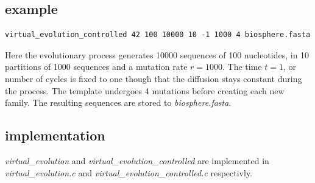 \subsection{example}
\begin{lstlisting}
virtual_evolution_controlled 42 100 10000 10 -1 1000 4 biosphere.fasta
\end{lstlisting}
Here the evolutionary process generates 10000 sequences of 100
nucleotides, in 10 partitions of 1000 sequences and a mutation rate
$r=1000$. The time $t=1$, or number of cycles is fixed to one though
that the diffusion stays constant during the process. The template
undergoes 4 mutations before creating each new family. The resulting
sequences are stored to \emph{biosphere.fasta}.

\subsection{implementation}
\emph{virtual\_evolution} and \emph{virtual\_evolution\_controlled}
are implemented in \emph{virtual\_evolution.c} and
\emph{virtual\_evolution\_controlled.c} respectivly. 




